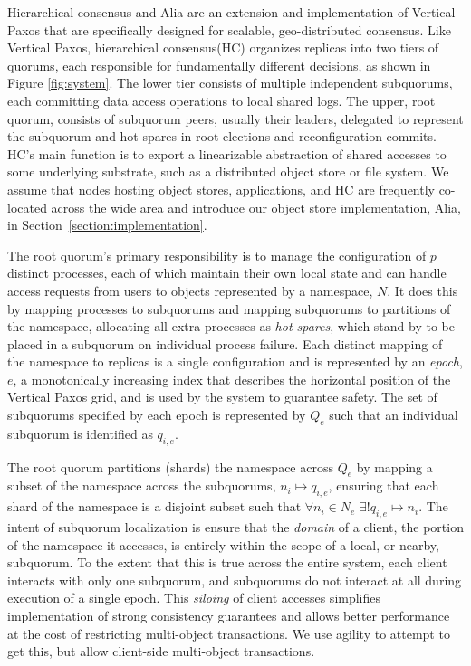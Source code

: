 \documentclass[10pt,conference]{IEEEtran}
\newcommand{\hc}{hierarchical consensus\xspace}
\newcommand{\Hc}{Hierarchical consensus\xspace}
\newcommand{\sub}{subquorum\xspace}
\newcommand{\subs}{subquorums\xspace}
\newcommand{\roo}{root quorum\xspace}
\begin{document}
\Hc and Alia are an extension and implementation of Vertical Paxos that are specifically
designed for scalable, geo-distributed consensus.
Like Vertical Paxos, \hc (HC) organizes replicas into two tiers of quorums, each
responsible for fundamentally different decisions, as shown in Figure \ref{fig:system}.
The lower tier consists of multiple independent subquorums, each committing data access
operations to local shared logs.
The upper, root quorum, consists of subquorum peers, usually their leaders, delegated to
represent the subquorum and hot spares in root elections and reconfiguration commits.
HC's main function is to export a linearizable abstraction of shared accesses to some
underlying substrate, such as a distributed object store or file system.
We assume that nodes hosting object stores, applications, and HC are frequently
co-located across the wide area and introduce our object store implementation, Alia,
in Section~\ref{section:implementation}.

The \roo's primary responsibility is to manage the configuration of $p$ distinct
processes, each of which maintain their own local state and can handle access requests
from users to objects represented by a namespace, $N$.
It does this by mapping processes to \subs and mapping \subs to partitions of the
namespace, allocating all extra processes as \emph{hot spares}, which stand by to be
placed in a \sub on individual process failure.
Each distinct mapping of the namespace to replicas is a single configuration and is
represented by an \emph{epoch}, $e$, a monotonically increasing index that describes
the horizontal position of the Vertical Paxos grid, and is used by the system to
guarantee safety.
The set of \subs specified by each epoch is represented by $Q_e$ such that an individual
\sub is identified as $q_{i,e}$.

The \roo partitions (shards) the namespace across $Q_e$ by mapping a subset of the
namespace across the \subs, $n_i \mapsto q_{i,e}$, ensuring that each shard of the
namespace is a disjoint subset such that
$\forall n_i \in N_e$ $\exists! q_{i,e} \mapsto n_i$.
The intent of subquorum localization is ensure that the \emph{domain} of a client, the
portion of the namespace it accesses, is entirely within the scope of a local, or
nearby, subquorum.
To the extent that this is true across the entire system, each client interacts with
only one subquorum, and subquorums do not interact at all during execution of a single
epoch.
This \emph{siloing} of client accesses simplifies implementation of strong consistency
guarantees and allows better performance at the cost of restricting multi-object
transactions.
We use agility to attempt to get this, but allow client-side multi-object transactions.
\end{document}
